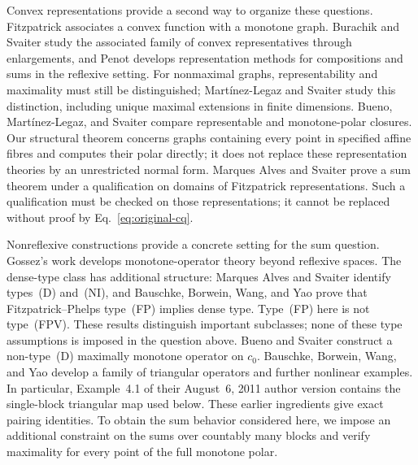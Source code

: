 Convex representations provide a second way to organize these questions.
Fitzpatrick \cite{fitzpatrick1988} associates a convex function with a
monotone graph. Burachik and Svaiter \cite{burachiksvaiter2002} study the
associated family of convex representatives through enlargements, and
Penot \cite{penot2004} develops representation methods for compositions
and sums in the reflexive setting. For nonmaximal graphs,
representability and maximality must still be distinguished;
Mart\'{i}nez-Legaz and Svaiter \cite{martinezsvaiter2005} study this
distinction, including unique maximal extensions in finite dimensions.
Bueno, Mart\'{i}nez-Legaz,
and Svaiter \cite{buenomartinezsvaiter2014} compare representable and
monotone-polar closures. Our structural theorem concerns graphs containing
every point in specified affine fibres and computes their polar directly; it does not
replace these representation theories by an unrestricted normal form.
Marques Alves and Svaiter \cite{marquessvaiter2012} prove a sum theorem
under a qualification on domains of Fitzpatrick representations.
Such a qualification must be checked on those representations; it cannot
be replaced without proof by Eq.~\eqref{eq:original-cq}.

Nonreflexive constructions provide a concrete setting for the sum question.
Gossez's work \cite{gossez1971} develops monotone-operator theory beyond
reflexive spaces. The dense-type class has additional structure:
Marques Alves and Svaiter \cite{marquessvaiter2010} identify types~(D)
and~(NI), and Bauschke, Borwein, Wang, and Yao \cite{bauschkefp2012}
prove that Fitzpatrick--Phelps type~(FP) implies dense type.
Type~(FP) here is not type~(FPV). These results distinguish important
subclasses; none of these type assumptions is imposed in the question above.
Bueno and Svaiter \cite{buenosvaiter2011} construct a non-type~(D)
maximally monotone operator on $c_0$. Bauschke, Borwein, Wang, and Yao
\cite{bauschkeetal2011} develop a family of triangular operators and
further nonlinear examples. In particular, Example~4.1 of their
August~6, 2011 author version contains
the single-block triangular map used below. These earlier ingredients
give exact pairing identities. To obtain the sum behavior considered
here, we impose an additional constraint on the sums over countably many
blocks and verify maximality for every point of the full monotone polar.

